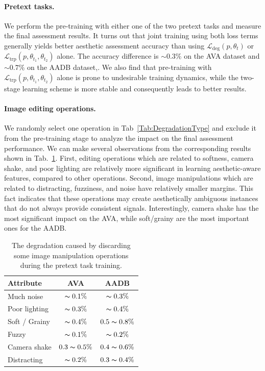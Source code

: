 \documentclass[letterpaper]{article}
\newcommand{\patch}{p}
\newcommand{\transformation}{t}
\newcommand{\loss}{\mathcal{L}}
\newcommand{\degradationloss}{\loss_{\mathrm{deg}}}
\newcommand{\tripletloss}{\loss_{\mathrm{trp}}}
\begin{document}
\paragraph{Pretext tasks.}
We perform the pre-training with either one of the two pretext tasks and measure the final assessment results.
It turns out that joint training using both loss terms generally yields better aesthetic assessment accuracy than using $\degradationloss(\patch, \theta_{\transformation})$ or $\tripletloss(\patch, \theta_{\transformation_1}, \theta_{\transformation_2})$ alone.
The accuracy difference is $\sim 0.3\%$ on the AVA dataset and $\sim 0.7\%$ on the AADB dataset,.
We also find that pre-training with $\tripletloss(\patch, \theta_{\transformation_1}, \theta_{\transformation_2})$ alone is prone to undesirable training dynamics, while the two-stage learning scheme is more stable and consequently leads to better results.

\paragraph{Image editing operations.}
We randomly select one operation in Tab~\ref{Tab:DegradationType} and exclude it from the pre-training stage to analyze the impact on the final assessment performance.
We can make several observations from the corresponding results shown in Tab.~\ref{tab:AblationStudyOfOperations}.
First, editing operations which are related to softness, camera shake, and poor lighting are relatively more significant in learning aesthetic-aware features, compared to other operations.
Second, image manipulations which are related to distracting, fuzziness, and noise have relatively smaller margins.
This fact indicates that these operations may create aesthetically ambiguous instances that do not always provide consistent signals.
Interestingly, camera shake has the most significant impact on the AVA, while soft/grainy are the most important ones for the AADB.

\begin{table}
    \centering
    \caption{The degradation caused by discarding some image manipulation operations during the pretext task training.}
    \label{tab:AblationStudyOfOperations}
        \begin{tabular}{l|c|c}
        \toprule
        Attribute & AVA & AADB \\
        \hline
        Much noise         & $\thicksim 0.1\%$ & $\thicksim 0.3\%$ \\
        Poor lighting       & $\thicksim 0.3\%$ & $\thicksim 0.4\%$ \\
        Soft / Grainy       & $\thicksim 0.4\%$ & $0.5 \thicksim 0.8\%$ \\
        Fuzzy                  & $\thicksim 0.1\%$ & $\thicksim 0.2\%$ \\
        Camera shake    & $0.3 \thicksim 0.5\%$ & $0.4 \thicksim 0.6\%$ \\
        Distracting           & $\thicksim 0.2\%$ & $0.3 \thicksim 0.4\%$ \\
        \bottomrule
    \end{tabular}
\end{table}
\end{document}
